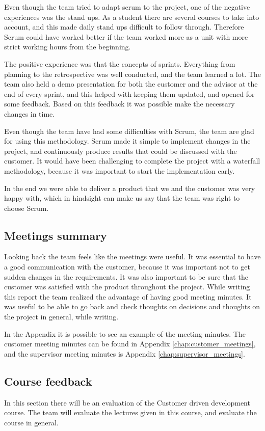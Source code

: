 Even though the team tried to adapt scrum to the project, one of the negative experiences was the stand ups. As a student there are several courses to take into account, and this made daily stand ups difficult to follow through. Therefore Scrum could have worked better if the team worked more as a unit with more strict working hours from the beginning.

The positive experience was that the concepts of sprints. Everything from planning to  the retrospective was well conducted, and the team learned a lot. The team also held a demo presentation for both the customer and the advisor at the end of every sprint, and this helped with keeping them updated, and opened for some feedback. Based on this feedback it was possible make the necessary changes in time.

Even though the team have had some difficulties with Scrum, the team are glad for using this methodology. Scrum made it simple to implement changes in the project, and continuously produce results that could be discussed with the customer. It would have been challenging to complete the project with a waterfall methodology, because it was important to start the implementation early.  

In the end we were able to deliver a product that we and the customer was very happy with, which in hindsight can make us say that the team was right to choose Scrum.

\subsection{Meetings summary}
Looking back the team feels like the meetings were useful. It was essential to have a good communication with the customer, because it was important not to get sudden changes in the requirements. It was also important to be sure that the customer was satisfied with the product throughout the project. While writing this report the team realized the advantage of having good meeting minutes. It was useful to be able to go back and check thoughts on decisions and thoughts on the project in general, while writing.

In the Appendix it is possible to see an example of the meeting minutes. The customer meeting minutes can be found in Appendix \ref{chap:customer_meetings}, and the supervisor meeting minutes is Appendix \ref{chap:supervisor_meetings}. 
\subsection{Course feedback}
In this section there will be an evaluation of the Customer driven development course. The team will evaluate the lectures given in this course, and evaluate the course in general.

